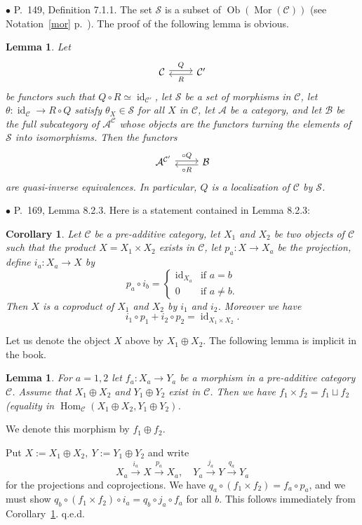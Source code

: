 \documentclass[12pt]{article}
\newtheorem{lem}[thm]{Lemma}
\newtheorem{cor}[thm]{Corollary}
\theoremstyle{remark}
\newcommand{\bu}{\bullet}
\newcommand{\n}{\noindent}
\newcommand{\cc}{\mathcal}
\newcommand{\A}{\mathcal A}
\newcommand{\B}{\mathcal B}
\newcommand{\C}{\mathcal C}
\newcommand{\xr}{\xrightarrow}
\DeclareMathOperator{\id}{id}
\DeclareMathOperator{\h}{Hom}
\DeclareMathOperator{\Mor}{Mor}
\DeclareMathOperator{\Ob}{Ob}
\begin{document}

\n$\bu$ P.~149, Definition 7.1.1. The set $\cc S$ is a subset of $\Ob(\Mor(\C))$ (see Notation~\ref{mor} p.~\pageref{mor}). The proof of the following lemma is obvious. 
%
\begin{lem}\label{711}
%
Let 
$$
\begin{tikzcd}\C\ar[yshift=.5ex]{r}{Q}&\C'\ar[yshift=-.4ex]{l}{R}\end{tikzcd}
$$ 
be functors such that $Q\circ R\simeq\id_{\C'}$, let $\cc S$ be a set of morphisms in $\C$, let $\theta:\id_\C\to R\circ Q$ satisfy $\theta_X\in\cc S$ for all $X$ in $\C$, let $\A$ be a category, and let $\B$ be the full subcategory of $\A^\C$ whose objects are the functors turning the elements of $\cc S$ into isomorphisms. Then the functors 
$$
\begin{tikzcd}\A^{\C'}\ar[yshift=.4ex]{r}{\circ Q}&\B\ar[yshift=-.5ex]{l}{\circ R}\end{tikzcd}
$$ 
are quasi-inverse equivalences. In particular, $Q$ is a localization of $\C$ by $\cc S$.
%
\end{lem}


\n$\bu$ P.~169, Lemma 8.2.3. Here is a statement contained in Lemma 8.2.3:
%
\begin{cor}\label{823}
Let $\C$ be a pre-additive category, let $X_1$ and $X_2$ be two objects of $\C$ such that the product $X=X_1\times X_2$ exists in $\C$, let $p_a:X\to X_a$ be the projection, define $i_a:X_a\to X$ by 
$$
p_a\circ i_b=\begin{cases}\id_{X_a}&\text{if }a=b\\0&\text{if }a\not=b.\end{cases}
$$ 
Then $X$ is a coproduct of $X_1$ and $X_2$ by $i_1$ and $i_2$. Moreover we have 
$$
i_1\circ p_1+i_2\circ p_2=\id_{X_1\times X_2}.
$$
\end{cor}

Let us denote the object $X$ above by $X_1\oplus X_2$. The following lemma is implicit in the book. 

\begin{lem}
For $a=1,2$ let $f_a:X_a\to Y_a$ be a morphism in a pre-additive category $\C$. Assume that $X_1\oplus X_2$ and $Y_1\oplus Y_2$ exist in $\C$. Then we have $f_1\times f_2=f_1\sqcup f_2$ (equality in $\h_\C(X_1\oplus X_2,Y_1\oplus Y_2)$. 
\end{lem} 

We denote this morphism by $f_1\oplus f_2$.\medskip 

\n{\em Proof.} Put $X:=X_1\oplus X_2,\ Y:=Y_1\oplus Y_2$ and write 
$$
X_a\xr{i_a}X\xr{p_a}X_a,\quad Y_a\xr{j_a}Y\xr{q_a}Y_a
$$ 
for the projections and coprojections. We have $q_a\circ(f_1\times f_2)=f_a\circ p_a$, and we must show $q_b\circ (f_1\times f_2)\circ i_a=q_b\circ j_a\circ f_a$ for all $b$. This follows immediately from Corollary~\ref{823}. q.e.d. 
\end{document}
